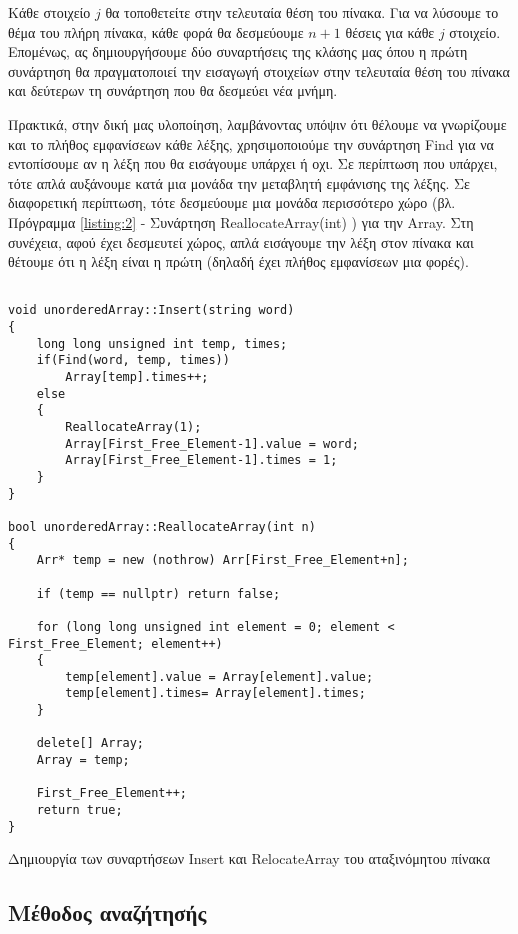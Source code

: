 Κάθε στοιχείο $j$ θα τοποθετείτε στην τελευταία θέση του πίνακα. Για να λύσουμε το θέμα του πλήρη πίνακα, κάθε φορά θα δεσμεύουμε $n+1$ θέσεις για κάθε $j$ στοιχείο. Επομένως, ας δημιουργήσουμε δύο συναρτήσεις της κλάσης μας όπου η πρώτη συνάρτηση θα πραγματοποιεί την εισαγωγή στοιχείων στην τελευταία θέση του πίνακα και δεύτερων τη συνάρτηση που θα δεσμεύει νέα μνήμη.

Πρακτικά, στην δική μας υλοποίηση, λαμβάνοντας υπόψιν ότι θέλουμε να γνωρίζουμε και το πλήθος εμφανίσεων κάθε λέξης, χρησιμοποιούμε την συνάρτηση \en Find \gr για να εντοπίσουμε αν η λέξη που θα εισάγουμε υπάρχει ή οχι. Σε περίπτωση που υπάρχει, τότε απλά αυξάνουμε κατά μια μονάδα την μεταβλητή εμφάνισης της λέξης. Σε διαφορετική περίπτωση, τότε δεσμεύουμε μια μονάδα περισσότερο χώρο (βλ. Πρόγραμμα \ref{listing:2} - Συνάρτηση \en ReallocateArray(int) \gr ) για την \en Array\gr. Στη συνέχεια, αφού έχει δεσμευτεί χώρος, απλά εισάγουμε την λέξη στον πίνακα και θέτουμε ότι η λέξη είναι η πρώτη (δηλαδή έχει πλήθος εμφανίσεων μια φορές).


\en
\begin{listing}[ht]
\begin{verbatim}

void unorderedArray::Insert(string word)
{
    long long unsigned int temp, times;
    if(Find(word, temp, times))
        Array[temp].times++;
    else
    {
        ReallocateArray(1);
        Array[First_Free_Element-1].value = word;
        Array[First_Free_Element-1].times = 1;
    }
}

bool unorderedArray::ReallocateArray(int n)
{
    Arr* temp = new (nothrow) Arr[First_Free_Element+n];

    if (temp == nullptr) return false;

    for (long long unsigned int element = 0; element < First_Free_Element; element++)
    {
        temp[element].value = Array[element].value;
        temp[element].times= Array[element].times;
    }

    delete[] Array;
    Array = temp;

    First_Free_Element++;
    return true;
}

\end{verbatim}
\caption{Δημιουργία των συναρτήσεων Insert και RelocateArray του αταξινόμητου πίνακα}
\label{listing:2}
\end{listing}
\gr


\subsection{Μέθοδος αναζήτησής}

